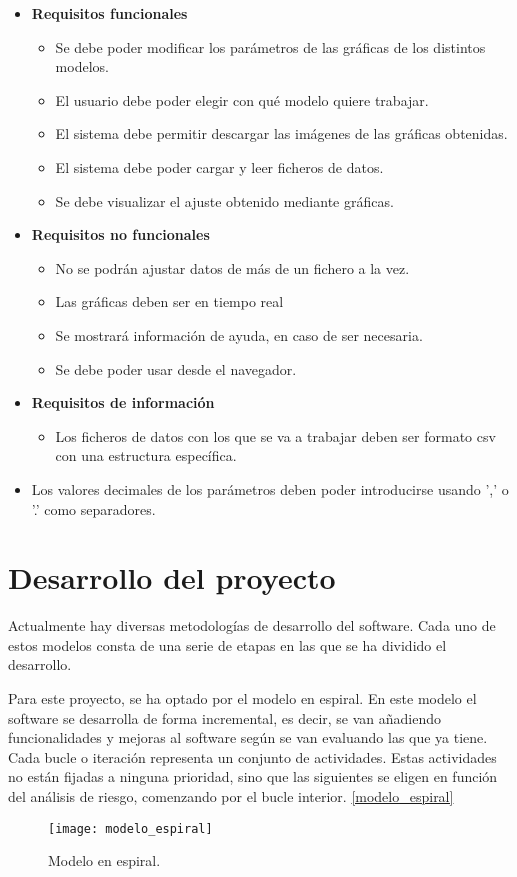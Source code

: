 \begin{itemize}
\item \textbf{Requisitos funcionales}
	\begin{itemize}
	\item Se debe poder modificar los parámetros de las gráficas de los distintos modelos.
	\item El usuario debe poder elegir con qué modelo quiere trabajar.
	\item El sistema debe permitir descargar las imágenes de las gráficas obtenidas.
	\item El sistema debe poder cargar y leer ficheros de datos.
	\item Se debe visualizar el ajuste obtenido mediante gráficas.
	\end{itemize}
\item \textbf{Requisitos no funcionales}
	\begin{itemize}
	\item No se podrán ajustar datos de más de un fichero a la vez.
	\item Las gráficas deben ser en tiempo real
	\item Se mostrará información de ayuda, en caso de ser necesaria.
	\item Se debe poder usar desde el navegador.
	\end{itemize}
\item \textbf{Requisitos de información}
	\begin{itemize}
	\item Los ficheros de datos con los que se va a trabajar deben ser formato csv con una estructura específica.
	\end{itemize}
	\item Los valores decimales de los parámetros deben poder introducirse usando ',' o '.' como separadores.
\end{itemize}

\section{Desarrollo del proyecto}

Actualmente hay diversas metodologías de desarrollo del software. Cada uno de estos modelos consta de una serie de etapas en las que se ha dividido el desarrollo.

Para este proyecto, se ha optado por el modelo en espiral. En este modelo el software se desarrolla de forma incremental, es decir, se van añadiendo funcionalidades y mejoras al software según se van evaluando las que ya tiene. Cada bucle o iteración representa un conjunto de actividades. Estas actividades no están fijadas a ninguna prioridad, sino que las siguientes se eligen en función del análisis de riesgo, comenzando por el bucle interior. \eqref{modelo_espiral}

\begin{figure}
\begin{center}
\caption{Modelo en espiral.}
\label{modelo_espiral}
\texttt{[image: modelo\_espiral]}
\end{center}
\end{figure}







